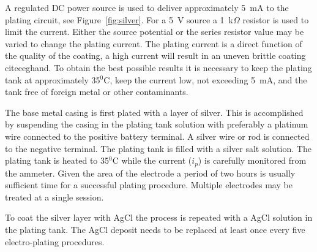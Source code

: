 A regulated DC power source is used to deliver approximately 5~mA to
the plating circuit, see Figure~\vref{fig:silver}. For a 5~V source a
1~k$\Omega$ resistor is used to limit the current. Either the source
potential or the series resistor value may be varied to change the
plating current. The plating current is a direct function of the
quality of the coating, a high current will result in an uneven
brittle coating cite{eeghand}. To obtain the best possible results it
is necessary to keep the plating tank at approximately 35$^0$C, keep
the current low, not exceeding 5~mA, and the tank free of foreign
metal or other contaminants.

The base metal casing is first plated with a layer of silver. This is
accomplished by suspending the casing in the plating tank solution
with preferably a platinum wire connected to the positive battery
terminal. A silver wire or rod is connected to the negative
terminal. The plating tank is filled with a silver salt solution. The
plating tank is heated to 35$^0$C while the current ($i_p$) is
carefully monitored from the ammeter. Given the area of the electrode
a period of two hours is usually sufficient time for a successful
plating procedure. Multiple electrodes may be treated at a single
session.

To coat the silver layer with AgCl the process is repeated with a AgCl
solution in the plating tank. The AgCl deposit needs to be replaced at
least once every five electro-plating procedures.


